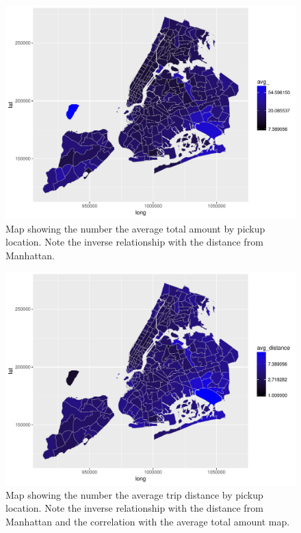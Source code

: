 \documentclass{acm_proc_article-sp-sigmod09}
\begin{document}
\begin{figure}
	\centering
	\includegraphics[width=1\columnwidth]{resources/base_plots/avg_total_amount_by_pickup_location_map.pdf}
	\caption{Map showing the number the average total amount by pickup location. Note the inverse relationship with the distance from Manhattan.}
	\label{fig:totalAmountMap}
\end{figure}

\begin{figure}
	\centering
	\includegraphics[width=1\columnwidth]{resources/base_plots/avg_distance_by_pickup_location_map.pdf}
	\caption{Map showing the number the average trip distance by pickup location. Note the inverse relationship with the distance from Manhattan and the correlation with the average total amount map.}
	\label{fig:distanceMap}
\end{figure}
\end{document}
